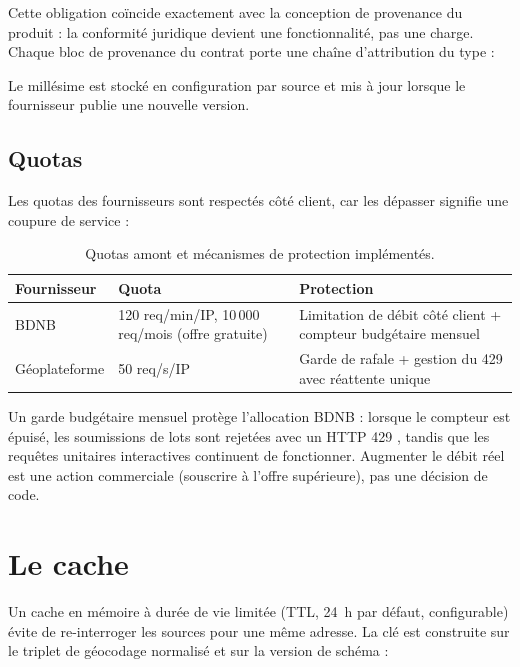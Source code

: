Cette obligation coïncide exactement avec la conception de provenance du
produit : la conformité juridique devient une fonctionnalité, pas une charge.
Chaque bloc de provenance du contrat porte une chaîne d'attribution du type :

\begin{center}
\end{center}

Le millésime est stocké en configuration par source et mis à jour lorsque le
fournisseur publie une nouvelle version.

\subsection{Quotas}

Les quotas des fournisseurs sont respectés côté client, car les dépasser
signifie une coupure de service :

\begin{table}[H]
\centering
\small
\caption{Quotas amont et mécanismes de protection implémentés.}
\label{tab:quotas}
\begin{tabularx}{\textwidth}{@{}l l X@{}}
\toprule
\textbf{Fournisseur} & \textbf{Quota} & \textbf{Protection} \\
\midrule
BDNB & 120 req/min/IP, 10\,000 req/mois (offre gratuite) &
  Limitation de débit côté client + compteur budgétaire mensuel \\
\addlinespace
Géoplateforme & 50 req/s/IP &
  Garde de rafale + gestion du 429 avec réattente unique \\
\bottomrule
\end{tabularx}
\end{table}

Un garde budgétaire mensuel protège l'allocation BDNB : lorsque le compteur est
épuisé, les soumissions de lots sont rejetées avec un HTTP 429
, tandis que les requêtes unitaires interactives
continuent de fonctionner. Augmenter le débit réel est une action commerciale
(souscrire à l'offre supérieure), pas une décision de code.

\section{Le cache}

Un cache en mémoire à durée de vie limitée (TTL, 24~h par défaut,
configurable) évite de re-interroger les sources pour une même adresse. La clé
est construite sur le triplet de géocodage normalisé et sur la version de
schéma :

